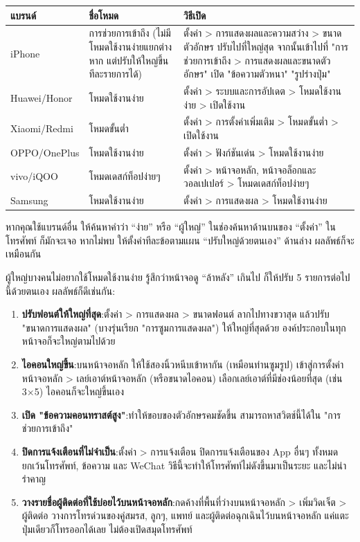 
\begin{center}
\begin{tabularx}{\linewidth}{|X|X|X|}
\hline
\textbf{แบรนด์} & \textbf{ชื่อโหมด} & \textbf{วิธีเปิด} \tabularnewline
\hline
iPhone & การช่วยการเข้าถึง (ไม่มีโหมดใช้งานง่ายแยกต่างหาก แต่ปรับให้ใหญ่ขึ้นทีละรายการได้) & ตั้งค่า > การแสดงผลและความสว่าง > ขนาดตัวอักษร ปรับไปที่ใหญ่สุด จากนั้นเข้าไปที่ "การช่วยการเข้าถึง > การแสดงผลและขนาดตัวอักษร" เปิด "ข้อความตัวหนา" "รูปร่างปุ่ม" \tabularnewline
Huawei/Honor & โหมดใช้งานง่าย & ตั้งค่า > ระบบและการอัปเดต > โหมดใช้งานง่าย > เปิดใช้งาน \tabularnewline
Xiaomi/Redmi & โหมดขั้นต่ำ & ตั้งค่า > การตั้งค่าเพิ่มเติม > โหมดขั้นต่ำ > เปิดใช้งาน \tabularnewline
OPPO/OnePlus & โหมดใช้งานง่าย & ตั้งค่า > ฟังก์ชันเด่น > โหมดใช้งานง่าย \tabularnewline
vivo/iQOO & โหมดเดสก์ท็อปง่ายๆ & ตั้งค่า > หน้าจอหลัก, หน้าจอล็อกและวอลเปเปอร์ > โหมดเดสก์ท็อปง่ายๆ \tabularnewline
Samsung & โหมดใช้งานง่าย & ตั้งค่า > การแสดงผล > โหมดใช้งานง่าย \tabularnewline
\hline
\end{tabularx}
\end{center}

หากคุณใช้แบรนด์อื่น ให้ค้นหาคำว่า “ง่าย” หรือ “ผู้ใหญ่” ในช่องค้นหาด้านบนของ “ตั้งค่า” ในโทรศัพท์ ก็มักจะเจอ หากไม่พบ ให้ตั้งค่าทีละข้อตามแผน “ปรับใหญ่ด้วยตนเอง” ด้านล่าง ผลลัพธ์ก็จะเหมือนกัน


ผู้ใหญ่บางคนไม่อยากใช้โหมดใช้งานง่าย รู้สึกว่าหน้าจอดู “ล้าหลัง” เกินไป ก็ให้ปรับ 5 รายการต่อไปนี้ด้วยตนเอง ผลลัพธ์ก็ดีเช่นกัน:

\begin{enumerate}
  \item \textbf{ปรับฟอนต์ให้ใหญ่ที่สุด}:ตั้งค่า > การแสดงผล > ขนาดฟอนต์ ลากไปทางขวาสุด แล้วปรับ "ขนาดการแสดงผล" (บางรุ่นเรียก "การซูมการแสดงผล") ให้ใหญ่ที่สุดด้วย องค์ประกอบในทุกหน้าจอก็จะใหญ่ตามไปด้วย
  \item \textbf{ไอคอนใหญ่ขึ้น}:บนหน้าจอหลัก ให้ใช้สองนิ้วหนีบเข้าหากัน (เหมือนท่านซูมรูป) เข้าสู่การตั้งค่าหน้าจอหลัก > เลย์เอาต์หน้าจอหลัก (หรือขนาดไอคอน) เลือกเลย์เอาต์ที่มีช่องน้อยที่สุด (เช่น 3×5) ไอคอนก็จะใหญ่ขึ้นเอง
  \item \textbf{เปิด "ข้อความคอนทราสต์สูง"}:ทำให้ขอบของตัวอักษรคมชัดขึ้น สามารถหาสวิตช์นี้ได้ใน "การช่วยการเข้าถึง"
  \item \textbf{ปิดการแจ้งเตือนที่ไม่จำเป็น}:ตั้งค่า > การแจ้งเตือน ปิดการแจ้งเตือนของ App อื่นๆ ทั้งหมด ยกเว้นโทรศัพท์, ข้อความ และ WeChat วิธีนี้จะทำให้โทรศัพท์ไม่ดังขึ้นมาเป็นระยะ และไม่น่ารำคาญ
  \item \textbf{วางรายชื่อผู้ติดต่อที่ใช้บ่อยไว้บนหน้าจอหลัก}:กดค้างที่พื้นที่ว่างบนหน้าจอหลัก > เพิ่มวิดเจ็ต > ผู้ติดต่อ วางการโทรด่วนของคู่สมรส, ลูกๆ, แพทย์ และผู้ติดต่อฉุกเฉินไว้บนหน้าจอหลัก แค่แตะปุ่มเดียวก็โทรออกได้เลย ไม่ต้องเปิดสมุดโทรศัพท์
\end{enumerate}


